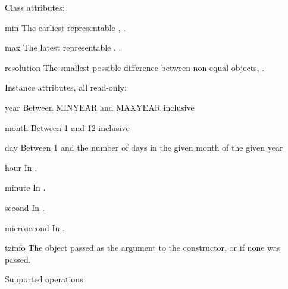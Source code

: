 Class attributes:

\begin{memberdesc}{min}
        The earliest representable ,
        .
\end{memberdesc}

\begin{memberdesc}{max}
        The latest representable ,
        .
\end{memberdesc}

\begin{memberdesc}{resolution}
        The smallest possible difference between non-equal 
        objects, .
\end{memberdesc}

Instance attributes, all read-only:

\begin{memberdesc}{year}
Between MINYEAR and MAXYEAR inclusive
\end{memberdesc}
\begin{memberdesc}{month}
Between 1 and 12 inclusive
\end{memberdesc}
\begin{memberdesc}{day}
Between 1 and the number of days in the given month
                    of the given year
\end{memberdesc}
\begin{memberdesc}{hour}
In .
\end{memberdesc}
\begin{memberdesc}{minute}
In .
\end{memberdesc}
\begin{memberdesc}{second}
In .
\end{memberdesc}
\begin{memberdesc}{microsecond}
In .
\end{memberdesc}
\begin{memberdesc}{tzinfo}
The object passed as the  argument to
                    the  constructor, or 
                    if none was passed.
\end{memberdesc}

Supported operations:


